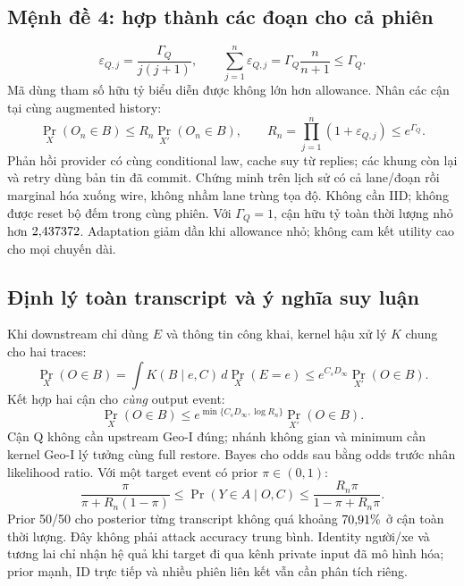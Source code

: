 \documentclass[10pt,a4paper]{article}
\begin{document}
\subsection{Mệnh đề 4: hợp thành các đoạn cho cả phiên}
\begin{equation}
\varepsilon_{Q,j}=\frac{\Gamma_Q}{j(j+1)},\qquad
\sum_{j=1}^n\varepsilon_{Q,j}=\Gamma_Q\frac{n}{n+1}\le\Gamma_Q.
\label{eq:allowance}
\end{equation}
Mã dùng tham số hữu tỷ biểu diễn được không lớn hơn allowance. Nhân các cận tại cùng augmented history:
\begin{equation}
\boxed{\Pr_X(O_n\in B)\le R_n\Pr_{X'}(O_n\in B),\qquad
R_n=\prod_{j=1}^n(1+\varepsilon_{Q,j})\le e^{\Gamma_Q}.}
\label{eq:whole}
\end{equation}
Phản hồi provider có cùng conditional law, cache suy từ replies; các khung còn lại và retry dùng bản tin đã commit.
Chứng minh trên lịch sử có cả lane/đoạn rồi marginal hóa xuống wire, không nhầm lane trùng tọa độ.
Không cần IID; không được reset bộ đếm trong cùng phiên. Với $\Gamma_Q=1$, cận hữu tỷ toàn thời lượng
nhỏ hơn $2{,}437372$. Adaptation giảm dần khi allowance nhỏ; không cam kết utility cao cho mọi chuyến dài.

\subsection{Định lý toàn transcript và ý nghĩa suy luận}
Khi downstream chỉ dùng $E$ và thông tin công khai, kernel hậu xử lý $K$ chung cho hai traces:
\begin{equation}
\Pr_X(O\in B)=\int K(B\mid e,C)\,d\Pr_X(E=e)
\le e^{C_sD_\infty}\Pr_{X'}(O\in B).
\label{eq:postprocessing}
\end{equation}
Kết hợp hai cận cho \emph{cùng} output event:
\begin{equation}
\boxed{\Pr_X(O\in B)\le e^{\min\{C_sD_\infty,\log R_n\}}\Pr_{X'}(O\in B).}
\label{eq:minimum}
\end{equation}
Cận Q không cần upstream Geo-I đúng; nhánh không gian và minimum cần kernel Geo-I lý tưởng cùng full restore.
Bayes cho odds sau bằng odds trước nhân likelihood ratio. Với một target event có prior $\pi\in(0,1)$:
\begin{equation}
\frac{\pi}{\pi+R_n(1-\pi)}\le\Pr(Y\in A\mid O,C)
\le\frac{R_n\pi}{1-\pi+R_n\pi}.
\label{eq:bayes}
\end{equation}
Prior 50/50 cho posterior từng transcript không quá khoảng $70{,}91\%$ ở cận toàn thời lượng.
Đây không phải attack accuracy trung bình. Identity người/xe và tương lai chỉ nhận hệ quả khi target đi qua
kênh private input đã mô hình hóa; prior mạnh, ID trực tiếp và nhiều phiên liên kết vẫn cần phân tích riêng.
\end{document}
